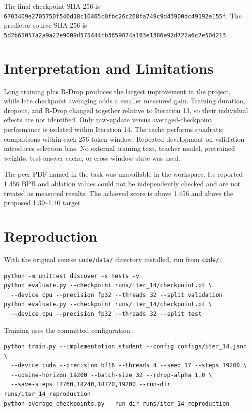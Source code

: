 \documentclass[10pt,a4paper]{article}
\begin{document}
The final checkpoint SHA-256 is \texttt{6703409e2705750f546d18c10465c0fbc26c268fa749c9d43900dc49192e155f}. The predictor source SHA-256 is \texttt{5d2b65057a2a9a22e9009d575444cb3659074a163e1386e92d722a6c7e50d213}.

\section{Interpretation and Limitations}
Long training plus R-Drop produces the largest improvement in the project, while late checkpoint averaging adds a smaller measured gain. Training duration, dropout, and R-Drop changed together relative to Iteration 13, so their individual effects are not identified. Only raw-update versus averaged-checkpoint performance is isolated within Iteration 14. The cache performs quadratic comparisons within each 256-token window. Repeated development on validation introduces selection bias. No external training text, teacher model, pretrained weights, test-answer cache, or cross-window state was used.

The peer PDF named in the task was unavailable in the workspace. Its reported 1.456 BPB and ablation values could not be independently checked and are not treated as measured results. The achieved score is above 1.456 and above the proposed 1.30--1.40 target.

\section{Reproduction}
With the original course \texttt{code/data/} directory installed, run from \texttt{code/}:
\begin{verbatim}
python -m unittest discover -s tests -v
python evaluate.py --checkpoint runs/iter_14/checkpoint.pt \
  --device cpu --precision fp32 --threads 32 --split validation
python evaluate.py --checkpoint runs/iter_14/checkpoint.pt \
  --device cpu --precision fp32 --threads 32 --split test
\end{verbatim}
Training uses the committed configuration:
\begin{verbatim}
python train.py --implementation student --config configs/iter_14.json \
  --device cuda --precision bf16 --threads 4 --seed 17 --steps 19200 \
  --cosine-horizon 19200 --batch-size 32 --rdrop-alpha 1.0 \
  --save-steps 17760,18240,18720,19200 --run-dir runs/iter_14_reproduction
python average_checkpoints.py --run-dir runs/iter_14_reproduction
\end{verbatim}
\end{document}

